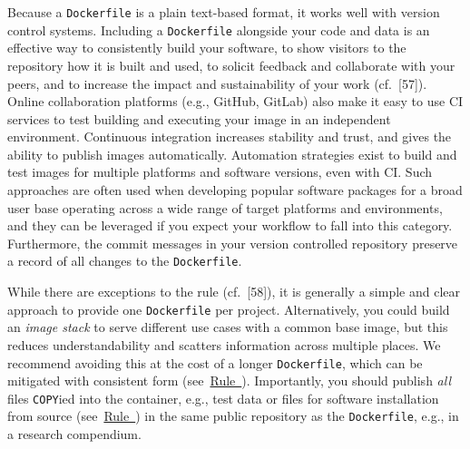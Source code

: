 \documentclass[10pt,letterpaper]{article}
\begin{document}
  \label{rule:publish} 

Because a \texttt{Dockerfile} is a plain text-based format, it works
well with version control systems. Including a \texttt{Dockerfile}
alongside your code and data is an effective way to consistently build
your software, to show visitors to the repository how it is built and
used, to solicit feedback and collaborate with your peers, and to
increase the impact and sustainability of your work (cf.~{[}57{]}).
Online collaboration platforms (e.g., GitHub, GitLab) also make it easy
to use CI services to test building and executing your image in an
independent environment. Continuous integration increases stability and
trust, and gives the ability to publish images automatically. Automation
strategies exist to build and test images for multiple platforms and
software versions, even with CI. Such approaches are often used when
developing popular software packages for a broad user base operating
across a wide range of target platforms and environments, and they can
be leveraged if you expect your workflow to fall into this category.
Furthermore, the commit messages in your version controlled repository
preserve a record of all changes to the \texttt{Dockerfile}.

While there are exceptions to the rule (cf.~{[}58{]}), it is generally a
simple and clear approach to provide one \texttt{Dockerfile} per
project. Alternatively, you could build an \emph{image stack} to serve
different use cases with a common base image, but this reduces
understandability and scatters information across multiple places. We
recommend avoiding this at the cost of a longer \texttt{Dockerfile},
which can be mitigated with consistent form
(see~\hyperref[{rule:formatting}]{Rule~}).
Importantly, you should publish \emph{all} files \texttt{COPY}ied into
the container, e.g., test data or files for software installation from
source (see~\hyperref[{rule:mount}]{Rule~}) in the
same public repository as the \texttt{Dockerfile}, e.g., in a research
compendium.
\end{document}
